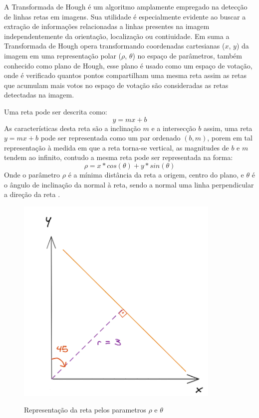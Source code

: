 A Transformada de Hough é um algoritmo amplamente empregado na detecção de linhas retas em imagens. Sua utilidade é especialmente evidente ao buscar a extração de informações relacionadas a linhas presentes na imagem independentemente da orientação, localização ou contiuidade. Em suma a Transformada de Hough opera transformando coordenadas cartesianas ($x$, $y$) da imagem em uma representação polar ($\rho$, $\theta$) no espaço de parâmetros, também conhecido como plano de Hough, esse plano é usado como um espaço de votação, onde é verificado quantos pontos compartilham uma mesma reta assim as retas que acumulam mais votos no espaço de votação são consideradas as retas detectadas na imagem\cite{transformadaHough1}.


Uma reta pode ser descrita como: $$y = mx + b$$ As características desta reta são a inclinação $m$ e a intersecção $b$ assim, uma reta $y = mx + b$ pode ser representada como um par ordenado $(b, m)$, porem em tal representação à medida em que a reta torna-se vertical, as magnitudes de $b$ e $m$ tendem ao infinito, contudo a mesma reta pode ser representada na forma:  $$\rho = x*cos(\theta)+y*sin(\theta)$$ Onde o parâmetro $\rho$ é a mínima distância da reta a origem, centro do plano, e $\theta$ é o ângulo de inclinação da normal à reta, sendo a normal uma linha perpendicular a direção da reta \cite{detectBar}.

\begin{figure}[!htb]
	\centering
    \caption{Representação da reta pelos parametros $\rho$ e $\theta$}
	\includegraphics[scale=2]{figuras/math/rhotheta.png}
    \label{fig:Representacao da reta pelos parametros}
\end{figure}

